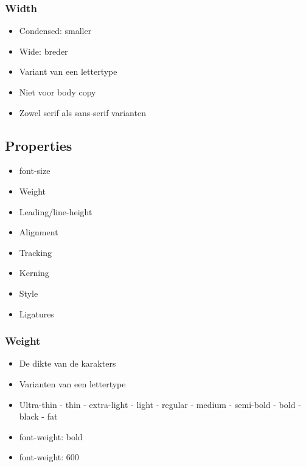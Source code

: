 \documentclass{article}
\begin{document}
\subsubsection{Width}
\begin{itemize}
    \item Condensed: smaller
    \item Wide: breder
    \item Variant van een lettertype
    \item Niet voor body copy
    \item Zowel serif als sans-serif varianten
\end{itemize}

\subsection{Properties}
\begin{itemize}
    \item font-size
    \item Weight
    \item Leading/line-height
    \item Alignment
    \item Tracking
    \item Kerning
    \item Style
    \item Ligatures
\end{itemize}

\subsubsection{Weight}
\begin{itemize}
    \item De dikte van de karakters
    \item Varianten van een lettertype
    \item Ultra-thin - thin - extra-light - light - regular - medium - semi-bold - bold - black - fat
    \item font-weight: bold
    \item font-weight: 600
\end{itemize}
\end{document}
